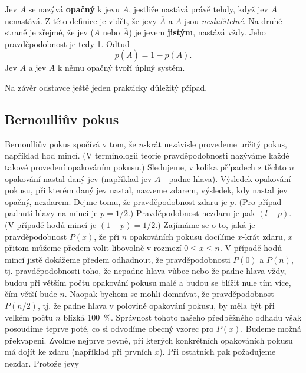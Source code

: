       Jev \(\overline{A}\) se nazývá \textbf{opačný} k jevu \(A\), jestliže nastává právě tehdy, 
      když jev \(A\) nenastává. Z této definice je vidět, že jevy \(\overline{A}\) a \(A\) jsou 
      \emph{neslučitelné}. Na druhé straně je zřejmé, že jev (\(A\) nebo \(\overline{A}\)) je jevem 
      \textbf{jistým}, nastává vždy. Jeho pravděpodobnost je tedy \num{1}. Odtud
      \begin{equation}\label{mai:eq054}
        p(\overline{A}) = 1 - p(A).
      \end{equation}
      Jev \(A\) a jev \(\overline{A}\) k němu opačný tvoří úplný systém.
      
      Na závěr odstavce ještě jeden prakticky důležitý případ.
      
    \subsection{Bernoulliův pokus}\label{mai:IchapIVsecIIssecIV}
      Bernoulliův pokus spočívá v tom, že \(n\)-krát nezávisle provedeme určitý pokus, například hod
      mincí. (V terminologii teorie pravděpodobnosti nazýváme každé takové provedení opakováním
      pokusu.) Sledujeme, v kolika případech z těchto \(n\) opakování nastal daný jev (například jev
      \(A\) - padne hlava). Výsledek opakování pokusu, při kterém daný jev nastal, nazveme zdarem,
      výsledek, kdy nastal jev opačný, nezdarem. Dejme tomu, že pravděpodobnost zdaru je \(p\). (Pro
      případ padnutí hlavy na minci je \(p = 1/2\).) Pravděpodobnost nezdaru je pak \((l - p)\). (V
      případě hodů mincí je \((1 - p) = 1/2\).) Zajímáme se o to, jaká je pravděpodobnost \(P(x)\),
      že při \(n\) opakováních pokusu docílíme \(x\)-krát zdaru, \(x\) přitom můžeme předem volit
      libovolně v rozmezí \(0 \leq x \leq n\). V případě hodů mincí jistě dokážeme předem odhadnout,
      že pravděpodobnosti \(P(0)\) a \(P(n)\), tj. pravděpodobnosti toho, že nepadne hlava vůbec
      nebo že padne hlava vždy, budou při větším počtu opakování pokusu malé a budou se blížit nule
      tím více, čím větší bude \(n\). Naopak bychom se mohli domnívat, že pravděpodobnost
      \(P(n/2)\), tj. že padne hlava v polovině opakování pokusu, by měla být při velkém počtu \(n\)
      blízká \SI{100}{\percent}. Správnost tohoto našeho předběžného odhadu však posoudíme teprve
      poté, co si odvodíme obecný vzorec pro \(P(x)\). Budeme možná překvapeni. Zvolme nejprve
      pevně, při kterých konkrétních opakováních pokusu má dojít ke zdaru  (například při prvních
      \(x\)). Při ostatních pak požadujeme nezdar. Protože jevy
